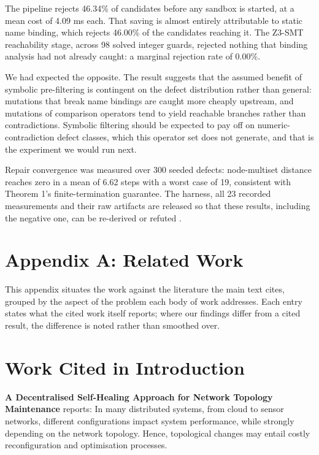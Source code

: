 \documentclass[10pt,twocolumn,letterpaper]{article}
\begin{document}
The pipeline rejects 46.34\% of candidates before any sandbox is started, at a mean cost of 4.09 ms each. That saving is almost entirely attributable to static name binding, which rejects 46.00\% of the candidates reaching it. The Z3-SMT reachability stage, across 98 solved integer guards, rejected nothing that binding analysis had not already caught: a marginal rejection rate of 0.00\%.

We had expected the opposite. The result suggests that the assumed benefit of symbolic pre-filtering is contingent on the defect distribution rather than general: mutations that break name bindings are caught more cheaply upstream, and mutations of comparison operators tend to yield reachable branches rather than contradictions. Symbolic filtering should be expected to pay off on numeric-contradiction defect classes, which this operator set does not generate, and that is the experiment we would run next.

Repair convergence was measured over 300 seeded defects: node-multiset distance reaches zero in a mean of 6.62 steps with a worst case of 19, consistent with Theorem 1's finite-termination guarantee. The harness, all 23 recorded measurements and their raw artifacts are released so that these results, including the negative one, can be re-derived or refuted \cite{arxiv_2501_02497,arxiv_2405_01543,crossref_10_1145_3689096_3689462}.





\section{Appendix A: Related Work}


This appendix situates the work against the literature the main text cites, grouped by the aspect of the problem each body of work addresses. Each entry states what the cited work itself reports; where our findings differ from a cited result, the difference is noted rather than smoothed over.


\section{Work Cited in Introduction}


\textbf{A Decentralised Self-Healing Approach for Network Topology Maintenance} \cite{arxiv_2010_11146} reports: In many distributed systems, from cloud to sensor networks, different configurations impact system performance, while strongly depending on the network topology. Hence, topological changes may entail costly reconfiguration and optimisation processes.
\end{document}
